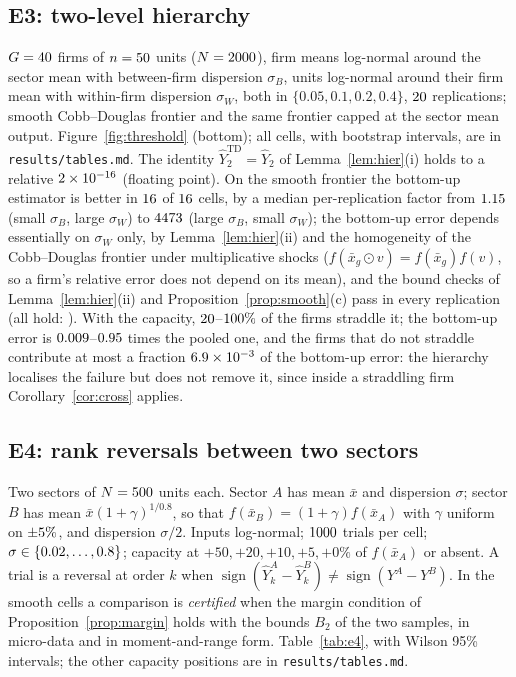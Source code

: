\documentclass[10pt,a4paper]{article}
\theoremstyle{plain}
\theoremstyle{definition}
\theoremstyle{remark}
\newcommand{\Yh}{\widehat{Y}}
\begin{document}
\subsection{E3: two-level hierarchy}

$G=40$ firms of $n=50$ units ($N=2000$), firm means log-normal around the sector mean with between-firm dispersion $\sigma_B$, units log-normal around their firm mean with within-firm dispersion $\sigma_W$, both in $\{0.05,0.1,0.2,0.4\}$, $20$ replications; smooth Cobb--Douglas frontier and the same frontier capped at the sector mean output. Figure~\ref{fig:threshold} (bottom); all cells, with bootstrap intervals, are in \texttt{results/tables.md}. The identity $\Yh_2^{\mathrm{TD}}=\Yh_2$ of Lemma~\ref{lem:hier}(i) holds to a relative $2\times 10^{-16}$ (floating point). On the smooth frontier the bottom-up estimator is better in $16$ of $16$ cells, by a median per-replication factor from $1.15$ (small $\sigma_B$, large $\sigma_W$) to $4473$ (large $\sigma_B$, small $\sigma_W$); the bottom-up error depends essentially on $\sigma_W$ only, by Lemma~\ref{lem:hier}(ii) and the homogeneity of the Cobb--Douglas frontier under multiplicative shocks ($f(\bar x_g\odot v)=f(\bar x_g)f(v)$, so a firm's relative error does not depend on its mean), and the bound checks of Lemma~\ref{lem:hier}(ii) and Proposition~\ref{prop:smooth}(c) pass in every replication (all hold: \EthreeBoundsHold). With the capacity, $20$--$100\%$ of the firms straddle it; the bottom-up error is $0.009$--$0.95$ times the pooled one, and the firms that do not straddle contribute at most a fraction $6.9\times 10^{-3}$ of the bottom-up error: the hierarchy localises the failure but does not remove it, since inside a straddling firm Corollary~\ref{cor:cross} applies.

\subsection{E4: rank reversals between two sectors}

Two sectors of $N=500$ units each. Sector $A$ has mean $\bar x$ and dispersion $\sigma$; sector $B$ has mean $\bar x(1+\gamma)^{1/0.8}$, so that $f(\bar x_B)=(1+\gamma)f(\bar x_A)$ with $\gamma$ uniform on $\pm5\%$, and dispersion $\sigma/2$. Inputs log-normal; $1000$ trials per cell; $\sigma\in\{0.02,\dots,0.8\}$; capacity at $+50,+20,+10,+5,+0\%$ of $f(\bar x_A)$ or absent. A trial is a reversal at order $k$ when $\operatorname{sign}(\Yh_k^A-\Yh_k^B)\ne\operatorname{sign}(Y^A-Y^B)$. In the smooth cells a comparison is \emph{certified} when the margin condition of Proposition~\ref{prop:margin} holds with the bounds $B_2$ of the two samples, in micro-data and in moment-and-range form. Table~\ref{tab:e4}, with Wilson 95\% intervals; the other capacity positions are in \texttt{results/tables.md}.
\end{document}
